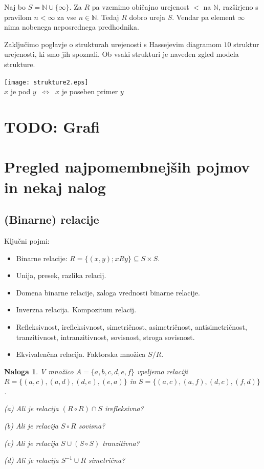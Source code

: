 \documentclass[11pt,paper=b5,footinclude,headinclude]{scrbook} %
\newcounter{example}
\def\cee {{~\Leftrightarrow~}}
\newtheorem*{problem}{Naloga}
\begin{document}
\bigskip
\begin{example*}
Naj bo $S = \mathbb{N}\cup\{\infty\}$. Za $R$ pa vzemimo običajno urejenost $<$ na $\mathbb{N}$, razširjeno s pravilom $n<\infty$ za vse $n\in \mathbb{N}$. Tedaj $R$ dobro ureja $S$. Vendar pa element $\infty$ nima nobenega neposrednega predhodnika.\end{example*}


Zaključimo poglavje o strukturah urejenosti s Hassejevim diagramom $10$ struktur urejenosti, ki smo jih spoznali.
Ob vsaki strukturi je naveden zgled modela strukture.

\begin{center}
\texttt{[image: strukture2.eps]}
~~\\
$x$ je pod $y$ $\cee$ $x$ je poseben primer $y$
\end{center}

\section{TODO: Grafi}

\section{Pregled najpomembnejših pojmov in nekaj nalog}


\subsection{(Binarne) relacije}

Ključni pojmi:
\begin{itemize}
  \item Binarne relacije:
  $R = \{(x,y) ; xRy \}\subseteq S\times S$.
  \item Unija, presek, razlika relacij.
  \item Domena binarne relacije, zaloga vrednosti binarne relacije.
  \item Inverzna relacija. Kompozitum relacij.
\item Refleksivnost, irefleksivnost, simetričnost, asimetričnost, antisimetričnost, tranzitivnost, intranzitivnost,
sovisnost, stroga sovisnost.
\item Ekvivalenčna relacija. Faktorska množica $S/R$.
\end{itemize}

\begin{problem}
V množico $A = \{a, b, c, d, e, f \}$ vpeljemo relaciji
$R = \{(a, c), (a, d), (d, e), (e, a)\}$ in
$S = \{(a, c), (a, f), (d, c), (f, d)\}$ .

(a) Ali je relacija $(R\circ R)\cap S$ irefleksivna?

(b) Ali je relacija $S\circ R$ sovisna?

(c) Ali je relacija $S\cup (S\circ S)$ tranzitivna?

(d) Ali je relacija $S^{-1}\cup R$ simetrična?
\end{problem}
\end{document}

